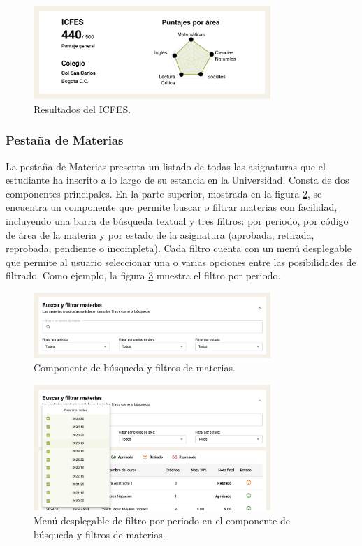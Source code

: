 \begin{figure}[H]
	\centering
	\includegraphics[width=0.8\textwidth]{assets/nes/icfes.png}
	\caption{Resultados del ICFES.}
	\label{fig:icfes}
\end{figure}

\subsubsection{Pestaña de Materias}

La pestaña de Materias presenta un listado de todas las asignaturas que el estudiante ha inscrito a lo largo de su estancia en la Universidad. Consta de dos componentes principales. En la parte superior, mostrada en la figura \ref{fig:filtros_materias}, se encuentra un componente que permite buscar o filtrar materias con facilidad, incluyendo una barra de búsqueda textual y tres filtros: por periodo, por código de área de la materia y por estado de la asignatura (aprobada, retirada, reprobada, pendiente o incompleta). Cada filtro cuenta con un menú desplegable que permite al usuario seleccionar una o varias opciones entre las posibilidades de filtrado. Como ejemplo, la figura \ref{fig:filtro_periodo_materias} muestra el filtro por periodo.

\begin{figure}[H]
	\centering
	\includegraphics[width=0.8\textwidth]{assets/nes/filtros_materias.png}
	\caption{Componente de búsqueda y filtros de materias.}
	\label{fig:filtros_materias}
\end{figure}

\begin{figure}[H]
	\centering
	\includegraphics[width=0.8\textwidth]{assets/nes/filtro_periodo_materias.png}
	\caption{Menú desplegable de filtro por periodo en el componente de búsqueda y filtros de materias.}
	\label{fig:filtro_periodo_materias}
\end{figure}

